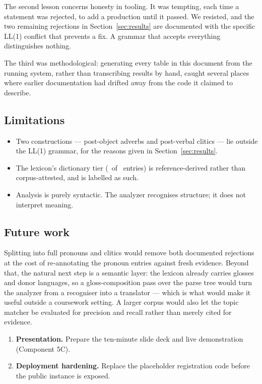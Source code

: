 The second lesson concerns honesty in tooling. It was tempting, each time a statement was
rejected, to add a production until it passed. We resisted, and the two remaining
rejections in Section~\ref{sec:results} are documented with the specific LL(1) conflict
that prevents a fix. A grammar that accepts everything distinguishes nothing.

The third was methodological: generating every table in this document from the running
system, rather than transcribing results by hand, caught several places where earlier
documentation had drifted away from the code it claimed to describe.

\subsection{Limitations}

\begin{itemize}[leftmargin=1.4em, itemsep=0.15em]
  \item Two constructions --- post-object adverbs and post-verbal clitics --- lie outside the
        LL(1) grammar, for the reasons given in Section~\ref{sec:results}.
  \item The lexicon's dictionary tier (\LexiconDictionary\ of \LexiconTotal\ entries) is
        reference-derived rather than corpus-attested, and is labelled as such.
  \item Analysis is purely syntactic. The analyzer recognises structure; it does not
        interpret meaning.
\end{itemize}

\subsection{Future work}

Splitting  into full pronouns and clitics would remove both documented
rejections at the cost of re-annotating the pronoun entries against fresh evidence. Beyond
that, the natural next step is a semantic layer: the lexicon already carries glosses and
donor languages, so a gloss-composition pass over the parse tree would turn the analyzer
from a recogniser into a translator --- which is what would make it useful outside a
coursework setting. A larger corpus would also let the topic matcher be evaluated for
precision and recall rather than merely cited for evidence.

\begin{todobox}
\begin{enumerate}[leftmargin=1.4em, itemsep=0.15em]
  \item \textbf{Presentation.} Prepare the ten-minute slide deck and live demonstration
        (Component 5C).
  \item \textbf{Deployment hardening.} Replace the placeholder registration code before the
        public instance is exposed.
\end{enumerate}
\end{todobox}
